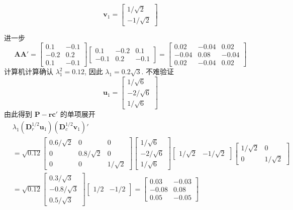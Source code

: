 
\[
\mathbf{v}_1=\begin{bmatrix}1/\sqrt{2}\\-1/\sqrt{2}\end{bmatrix}
\]

进一步
\[
\mathbf{A}\mathbf{A}'=
\begin{bmatrix}0.1&-0.1\\-0.2&0.2\\0.1&-0.1\end{bmatrix}
\begin{bmatrix}0.1&-0.2&0.1\\-0.1&0.2&-0.1\end{bmatrix}
=\begin{bmatrix}0.02&-0.04&0.02\\-0.04&0.08&-0.04\\0.02&-0.04&0.02\end{bmatrix}
\]
计算机计算确认 $\lambda_1^2=0.12$, 因此 $\lambda_1=0.2\sqrt{3}$. 不难验证
\[
\mathbf{u}_1=\begin{bmatrix}1/\sqrt{6}\\-2/\sqrt{6}\\1/\sqrt{6}\end{bmatrix}
\]
由此得到 $\mathbf{P}-\mathbf{r}\mathbf{c}'$ 的单项展开
\[
\begin{aligned}
&\lambda_1(\mathbf{D}_r^{1/2}\mathbf{u}_1)(\mathbf{D}_c^{1/2}\mathbf{v}_1)'\\
&=\sqrt{0.12}
\begin{bmatrix}0.6/\sqrt{2}&0&0\\0&0.8/\sqrt{2}&0\\0&0&1/\sqrt{2}\end{bmatrix}
\begin{bmatrix}1/\sqrt{6}\\-2/\sqrt{6}\\1/\sqrt{6}\end{bmatrix}
\begin{bmatrix}1/\sqrt{2}&-1/\sqrt{2}\end{bmatrix}
\begin{bmatrix}1/\sqrt{2}&0\\0&1/\sqrt{2}\end{bmatrix}\\
&=\sqrt{0.12}
\begin{bmatrix}0.3/\sqrt{3}\\-0.8/\sqrt{3}\\0.5/\sqrt{3}\end{bmatrix}
\begin{bmatrix}1/2&-1/2\end{bmatrix}
=\begin{bmatrix}0.03&-0.03\\-0.08&0.08\\0.05&-0.05\end{bmatrix}
\end{aligned}
\]
